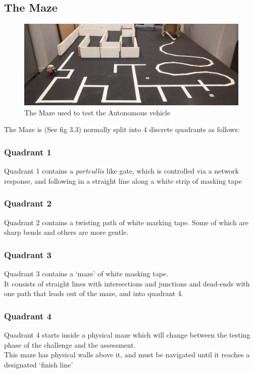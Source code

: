 \documentclass[paper=a4, fontsize=11pt]{scrartcl} %
\numberwithin{equation}{section} %
\numberwithin{figure}{section} %
\begin{document}
\subsection{The Maze}
\begin{figure}[h]
\includegraphics[width=\textwidth]{maze}
\centering
\caption{The Maze used to test the Autonomous vehicle}
\end{figure}
The Maze is (See fig 3.3) normally split into 4 discrete quadrants as follows:
\subsubsection{Quadrant 1}
Quadrant 1 contains a \textit{portcullis} like gate, which is controlled via a
network response, and following in a straight line along a white strip of
masking tape\\

\subsubsection{Quadrant 2}
Quadrant 2 contains a twisting path of white marking tape. Some of which are
sharp bends and others are more gentle.\\

\subsubsection{Quadrant 3}
Quadrant 3 contains a `maze' of white masking tape.\\
It consists of straight lines with intersections and junctions and dead-ends
with one path that leads out of the maze, and into quadrant 4.\\

\subsubsection{Quadrant 4}
Quadrant 4 starts inside a physical maze which will change between the testing
phase of the challenge and the assessment.\\
This maze  has physical walls above it, and must be navigated until it reaches a
designated `finish line'
\end{document}
